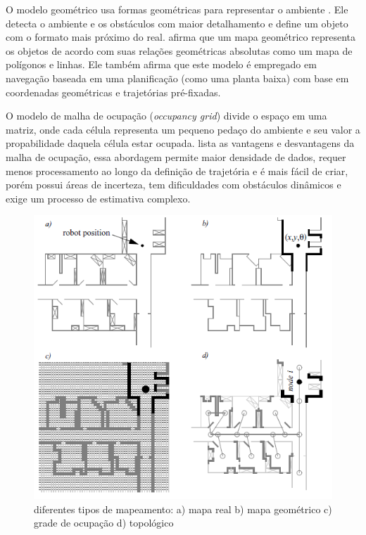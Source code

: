 O modelo geométrico usa formas geométricas para representar o ambiente \cite{Choset2005}. Ele detecta o ambiente e os obstáculos com maior detalhamento e define um objeto com o formato mais próximo do real. \cite{Secchi2008} afirma que um mapa geométrico representa os objetos de acordo com suas relações geométricas absolutas como um mapa de polígonos e linhas. Ele também afirma que este modelo é empregado em navegação baseada em uma planificação (como uma planta baixa) com base em coordenadas geométricas e trajetórias pré-fixadas. 

O modelo de malha de ocupação (\textit{occupancy grid}) divide o espaço em uma matriz, onde cada célula representa um pequeno pedaço do ambiente e seu valor a propabilidade daquela célula estar ocupada. \cite{Borenstein1996} lista as vantagens e desvantagens da malha de ocupação, essa abordagem permite maior densidade de dados, requer menos processamento ao longo da definição de trajetória e é mais fácil de criar, porém possui áreas de incerteza, tem dificuldades com obstáculos dinâmicos e exige um processo de estimativa complexo.

\begin{figure}[h]
	\centering
	\label{fig06}
		\includegraphics[keepaspectratio=true,scale=0.6]{figuras/mapas.png}
	\caption{diferentes tipos de mapeamento: a) mapa real b) mapa geométrico c) grade de ocupação d) topológico \cite{Siegwart2004}}
\end{figure}

